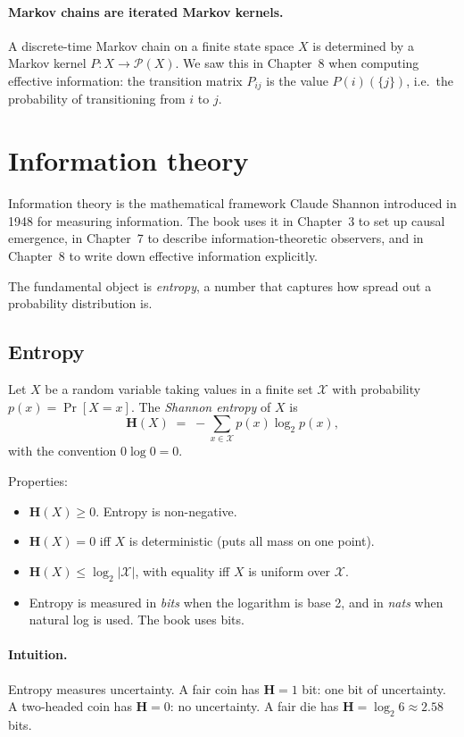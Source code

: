 \paragraph{Markov chains are iterated Markov kernels.} A
discrete-time Markov chain on a finite state space $X$ is determined
by a Markov kernel $P : X \to \mathcal{P}(X)$. We saw this in
Chapter~8 when computing effective information: the transition
matrix $P_{ij}$ is the value $P(i)(\{j\})$, i.e.\ the probability of
transitioning from $i$ to $j$.

\section{Information theory}

Information theory is the mathematical framework Claude Shannon
introduced in 1948 for measuring information. The book uses it in
Chapter~3 to set up causal emergence, in Chapter~7 to describe
information-theoretic observers, and in Chapter~8 to write down
effective information explicitly.

The fundamental object is \emph{entropy}, a number that captures
how spread out a probability distribution is.

\subsection*{Entropy}

Let $X$ be a random variable taking values in a finite set
$\mathcal{X}$ with probability $p(x) = \Pr[X = x]$. The
\emph{Shannon entropy} of $X$ is
\[
  \mathbf{H}(X) \;=\; -\sum_{x \in \mathcal{X}} p(x) \log_2 p(x),
\]
with the convention $0 \log 0 = 0$.

Properties:

\begin{itemize}[leftmargin=1.5em,itemsep=2pt]
  \item $\mathbf{H}(X) \geq 0$. Entropy is non-negative.
  \item $\mathbf{H}(X) = 0$ iff $X$ is deterministic (puts all mass
    on one point).
  \item $\mathbf{H}(X) \leq \log_2 |\mathcal{X}|$, with equality iff
    $X$ is uniform over $\mathcal{X}$.
  \item Entropy is measured in \emph{bits} when the logarithm is
    base 2, and in \emph{nats} when natural log is used. The book
    uses bits.
\end{itemize}

\paragraph{Intuition.} Entropy measures uncertainty. A fair coin
has $\mathbf{H} = 1$ bit: one bit of uncertainty. A two-headed coin
has $\mathbf{H} = 0$: no uncertainty. A fair die has $\mathbf{H} =
\log_2 6 \approx 2.58$ bits.

